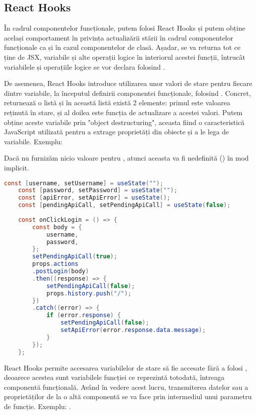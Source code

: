 \subsection{React Hooks}

În cadrul componentelor funcționale, putem folosi React Hooks\cite{.reacthooks} și putem obține același comportament în privința actualizării stării în cadrul componentelor funcționale ca și în cazul componentelor de clasă. Așadar, se va returna tot ce ține de JSX, variabile și alte operații logice în interiorul acestei funcții, întrucât variabilele și operațiile logice se vor declara folosind .\newline

De asemenea, React Hooks introduce utilizarea unor valori de stare pentru fiecare dintre variabile, la începutul definirii componentei funcționale, folosind .\newline
Concret,  returnează o listă și în această listă există 2 elemente: primul este valoarea reținută în stare, și al doilea este funcția de actualizare a acestei valori. Putem obține aceste variabile prin "object destructuring", aceasta fiind o caracteristică JavaScript utilizată pentru a extrage proprietăți din obiecte și a le lega de variabile.\newline
Exemplu: \newline

Dacă nu furnizăm nicio valoare pentru , atunci aceasta va fi nedefinită () în mod implicit.\newline

\begin{lstlisting}[language=Java]
	const [username, setUsername] = useState("");
	const [password, setPassword] = useState("");
	const [apiError, setApiError] = useState();
	const [pendingApiCall, setPendingApiCall] = useState(false);
	
	const onClickLogin = () => {
		const body = {
			username,
			password,
		};
		setPendingApiCall(true);
		props.actions
		.postLogin(body)
		.then((response) => {
			setPendingApiCall(false);
			props.history.push("/");
		})
		.catch((error) => {
			if (error.response) {
				setPendingApiCall(false);
				setApiError(error.response.data.message);
			}
		});
	};
\end{lstlisting}
\bigskip

React Hooks permite accesarea variabilelor de stare să fie accesate fără a folosi , deoarece acestea sunt variabilele funcției ce reprezintă totodată, întreaga componentă funcțională. Având în vedere acest lucru, transmiterea datelor sau a proprietăților de la o altă componentă se va face prin intermediul unui parametru de funcție.\newline
Exemplu: .\newline

